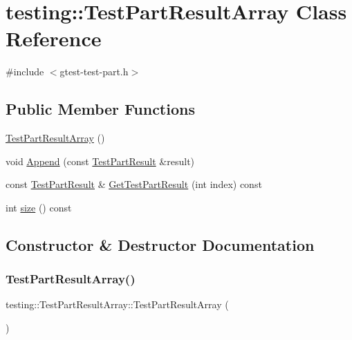 \hypertarget{classtesting_1_1_test_part_result_array}{}\section{testing\+:\+:Test\+Part\+Result\+Array Class Reference}
\label{classtesting_1_1_test_part_result_array}


{\ttfamily \#include $<$gtest-\/test-\/part.\+h$>$}

\subsection*{Public Member Functions}
\begin{DoxyCompactItemize}
\item 
\hyperlink{classtesting_1_1_test_part_result_array_ac9bfc830989c5328d7ff2ba8fa3c072b}{Test\+Part\+Result\+Array} ()
\item 
void \hyperlink{classtesting_1_1_test_part_result_array_a01844bd505b18a666324617a1b459558}{Append} (const \hyperlink{classtesting_1_1_test_part_result}{Test\+Part\+Result} \&result)
\item 
const \hyperlink{classtesting_1_1_test_part_result}{Test\+Part\+Result} \& \hyperlink{classtesting_1_1_test_part_result_array_aa44d02a01c87f47393b07951bab6e025}{Get\+Test\+Part\+Result} (int index) const
\item 
int \hyperlink{classtesting_1_1_test_part_result_array_a31555f11ba42b81ddad0a26a87710d0a}{size} () const
\end{DoxyCompactItemize}


\subsection{Constructor \& Destructor Documentation}
\mbox{\label{classtesting_1_1_test_part_result_array_ac9bfc830989c5328d7ff2ba8fa3c072b}} 
\subsubsection{\texorpdfstring{Test\+Part\+Result\+Array()}{TestPartResultArray()}}
{\footnotesize\ttfamily testing\+::\+Test\+Part\+Result\+Array\+::\+Test\+Part\+Result\+Array (\begin{DoxyParamCaption}{ }\end{DoxyParamCaption})\hspace{0.3cm}{\ttfamily [inline]}}




